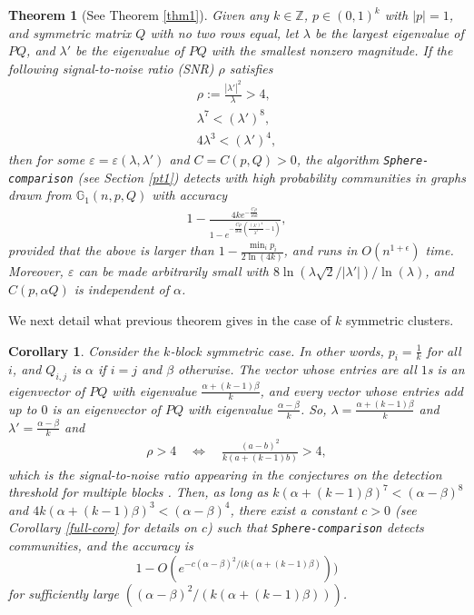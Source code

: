 \documentclass[11pt]{article}
\newcommand{\gss}{\mathbb{G}_1}
\newcommand{\e}{\varepsilon}
\newcommand{\1}{\mathbb{1}}
\newtheorem{theorem}{Theorem}
\newtheorem{corollary}{Corollary}
\begin{document}
\begin{theorem}[See Theorem \ref{thm1}]
Given any $k\in \mathbb{Z}$, $p\in (0,1)^k$ with $|p|=1$, and symmetric matrix $Q$ with no two rows equal, let $\lambda$ be the largest eigenvalue of $PQ$, and $\lambda'$ be the eigenvalue of $PQ$ with the smallest nonzero magnitude.
If the following signal-to-noise ratio (SNR) $\rho$ satisfies
\begin{align}
\rho:=\frac{|\lambda'|^2}{\lambda}>4,\\
\lambda^7<(\lambda')^8,\\
4\lambda^3<(\lambda')^4,
\end{align} 
then for some $\e=\e(\lambda,\lambda')$ and $C=C(p,Q)>0$, the algorithm {\tt Sphere-comparison} (see Section \ref{pt1}) detects with high probability communities in graphs drawn from $\gss(n,p,Q)$ with accuracy  
\begin{align}
1- \frac{4ke^{-\frac{C \rho}{16k}}}{1-e^{-\frac{C\rho}{16k}\left(\frac{(\lambda')^4}{\lambda^3}-1\right)}} ,
\end{align}
provided that the above is larger than $1-\frac{\min_i p_i}{2\ln(4k)}$, and runs in $O(n^{1+\epsilon})$ time. Moreover, $\e$ can be made arbitrarily small with $8\ln (\lambda\sqrt{2}/|\lambda'|)/\ln(\lambda)$, and $C(p,\alpha Q)$ is independent of $\alpha$.
\end{theorem}
We next detail what previous theorem gives in the case of $k$ symmetric clusters.  
\begin{corollary}
Consider the $k$-block symmetric case. In other words, $p_i=\frac{1}{k}$ for all $i$, and $Q_{i,j}$ is $\alpha$ if $i=j$ and $\beta$ otherwise. The vector whose entries are all $1$s is an eigenvector of $PQ$ with eigenvalue $\frac{\alpha+(k-1)\beta}{k}$, and every vector whose entries add up to $0$ is an eigenvector of $PQ$ with eigenvalue $\frac{\alpha-\beta}{k}$. So, $\lambda=\frac{\alpha+(k-1)\beta}{k}$ and $\lambda'=\frac{\alpha-\beta}{k}$
and 
\begin{align}
\rho > 4 \quad \Leftrightarrow \quad \frac{(a-b)^2}{k(a+(k-1)b)} >4,
\end{align}
which is the signal-to-noise ratio appearing in the conjectures on the detection threshold for multiple blocks \cite{decelle,mossel-sbm}. 
Then, as long as $k(\alpha+(k-1)\beta)^7<(\alpha-\beta)^8$ and $4k(\alpha+(k-1)\beta)^3<(\alpha-\beta)^4$, 
there exist a constant $c>0$ (see Corollary \ref{full-coro} for details on $c$) such that {\tt Sphere-comparison} detects communities, and the accuracy is $$1-O(e^{-c(\alpha-\beta)^2/(k(\alpha+(k-1)\beta)}))$$ for sufficiently large $((\alpha-\beta)^2/(k(\alpha+(k-1)\beta)))$. 
\end{corollary}
\end{document}
